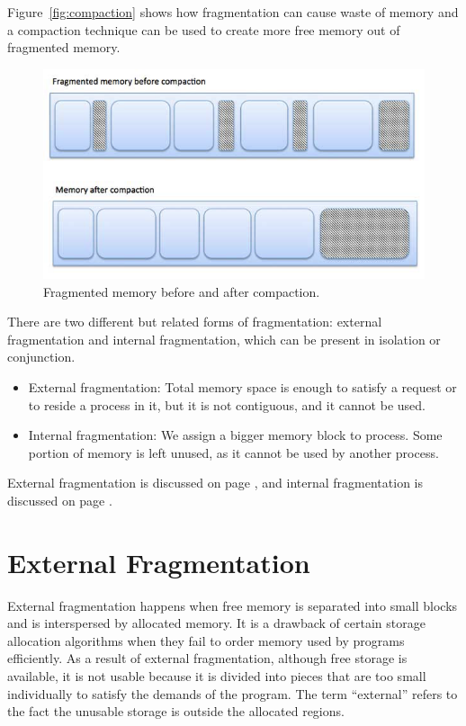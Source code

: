 \documentclass[doc,natbib,12pt]{apa6}
\begin{document}
	Figure~\vref{fig:compaction} shows how fragmentation can cause waste of memory
	and a compaction technique can be used to create more free memory out of
	fragmented memory.
	
	\begin{figure}[h]
		\centering
		\includegraphics[width=1\textwidth]{compaction.png}
		\caption{\label{fig:compaction}Fragmented memory before and after compaction. \citep{tutorialspoint2018}}
	\end{figure}
	
	There are two different but related forms of fragmentation: external fragmentation and internal fragmentation, which can be present in isolation or conjunction. 
	\begin{itemize}
		\item External fragmentation: Total memory space is enough to satisfy a request or to reside a process in it, but it is not contiguous, and it cannot be used.
		\item Internal fragmentation: We assign a bigger memory block to process. Some portion of memory is left unused, as it cannot be used by another process.
	\end{itemize}
	
	External fragmentation is discussed on page \pageref{chp:externalFragmentation}, and internal fragmentation is discussed on page \pageref{chp:internalFragmentation}.
	
	\newpage
	\section{External Fragmentation} \label{chp:externalFragmentation}
	External fragmentation happens when free memory is separated into small blocks and is interspersed by allocated memory. It is a drawback of certain storage allocation algorithms when they fail to order memory used by programs efficiently. As a result of external fragmentation, although free storage is available, it is not usable because it is divided into pieces that are too small individually to satisfy the demands of the program. The term ``external'' refers to the fact the unusable storage is outside the allocated regions.
	
\end{document}
